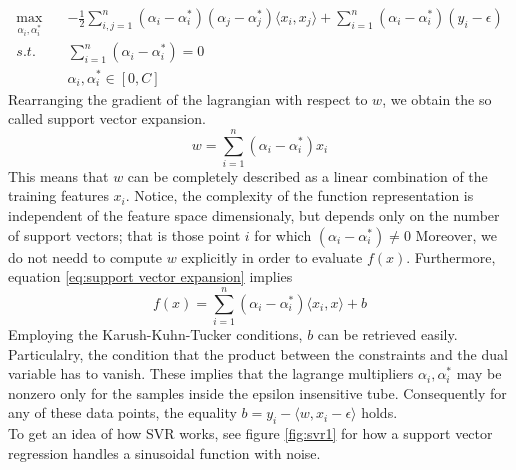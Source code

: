 \begin{equation}
    \begin{aligned}
        \max_{\alpha_i, \alpha_i^*} \quad& -\frac{1}{2}\sum\limits_{i,j=1}^n(\alpha_i-\alpha_i^*)(\alpha_j-\alpha_j^*)\langle x_i,x_j\rangle +\sum\limits_{i=1}^n(\alpha_i-\alpha_i^*)(y_i-\epsilon)
        \\
        s.t. \quad& \sum\limits_{i=1}^n(\alpha_i-\alpha_i^*)=0
        \\
        \quad& \alpha_i, \alpha_i^* \in [0, C]
    \end{aligned}
\end{equation}
Rearranging the gradient of the lagrangian with respect to $w$, we obtain the so called support vector expansion.
\begin{equation}\label{eq:support vector expansion}
    w=\sum\limits_{i=1}^n(\alpha_i-\alpha_i^*)x_i
\end{equation}
This means that $w$ can be completely described as a linear combination of the training features $x_i$.
Notice, the complexity of the function representation is independent of the feature space dimensionaly, but depends only on the number of support vectors; that is those point $i$ for which $(\alpha_i-\alpha_i^*)\neq 0$
Moreover, we do not needd to compute $w$ explicitly in order to evaluate $f(x)$.
Furthermore, equation \ref{eq:support vector expansion} implies
\begin{equation}
    f(x)=\sum\limits_{i=1}^n(\alpha_i-\alpha_i^*)\langle x_i, x\rangle +b
\end{equation}
Employing the Karush-Kuhn-Tucker conditions, $b$ can be retrieved easily. Particulalry, the condition that the product between the constraints and the dual variable has to vanish. These implies that the lagrange multipliers $\alpha_i, \alpha_i^*$ may be nonzero only for the samples inside the epsilon insensitive tube. Consequently for any of these data points, the equality $b=y_i-\langle w, x_i-\epsilon\rangle$ holds.
\\
To get an idea of how SVR works, see figure \ref{fig:svr1} for how a support vector regression handles a sinusoidal function with noise.
\\

